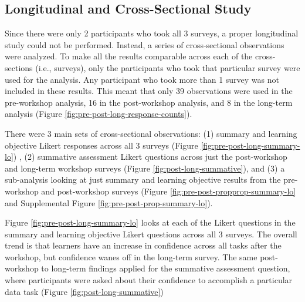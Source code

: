 \documentclass[030-workshop.tex]{subfiles}
\begin{document}
    \subsection{Longitudinal and Cross-Sectional Study}

        Since there were only 2 participants who took all 3 surveys,
        a proper longitudinal study could not be performed.
        Instead, a series of cross-sectional observations were analyzed.
        To make all the results comparable across each of the cross-sections (i.e., surveys),
        only the participants who took that particular survey were used for the analysis.
        Any participant who took more than 1 survey was not included in these results.
        This meant that only
        39 observations were used in the pre-workshop analysis,
        16 in the post-workshop analysis, and
        8 in the long-term analysis
        (Figure \ref{fig:pre-post-long-response-counts}).

        There were 3 main sets of cross-sectional observations:
        (1) summary and learning objective Likert responses across all 3 surveys
        (Figure \ref{fig:pre-post-long-summary-lo})
        ,
        (2) summative assessment Likert questions across just the post-workshop and long-term workshop surveys
        (Figure \ref{fig:post-long-summative}), and
        (3) a sub-analysis looking at just summary and learning objective results from the pre-workshop and post-workshop surveys
        (Figure \ref{fig:pre-post-propprop-summary-lo} and Supplemental Figure \ref{fig:pre-post-prop-summary-lo}).

        Figure \ref{fig:pre-post-long-summary-lo} looks at each of the Likert questions in the
        summary and learning objective Likert questions across all 3 surveys.
        The overall trend is that learners have an increase in confidence across all tasks after the workshop,
        but confidence wanes off in the long-term survey.
        The same post-workshop to long-term findings applied for the summative assessment question,
        where participants were asked about their confidence to accomplish a particular data task
        (Figure \ref{fig:post-long-summative})
\end{document}

